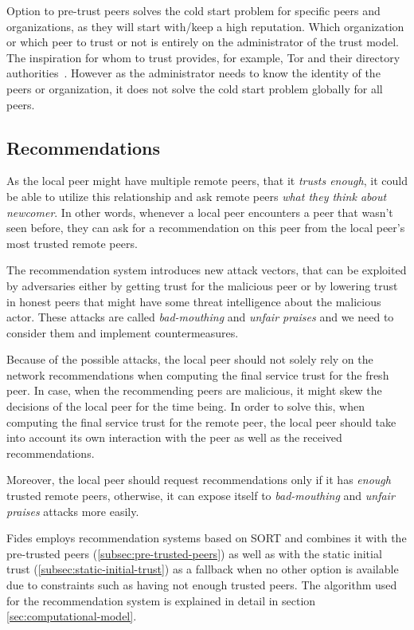 Option to pre-trust peers solves the cold start problem for specific peers and organizations, as they will start with/keep a high reputation.
Which organization or which peer to trust or not is entirely on the administrator of the trust model. The inspiration for whom to trust provides, for example, Tor and their directory authorities~\cite{torauth}.
However as the administrator needs to know the identity of the peers or organization, it does not solve the cold start problem globally for all peers.

\subsection{Recommendations}
\label{subsec:recommendations}
As the local peer might have multiple remote peers, that it \textit{trusts enough}, it could be able to utilize this relationship and ask remote peers \textit{what they think about newcomer}. 
In other words, whenever a local peer encounters a peer that wasn't seen before, they can ask for a recommendation on this peer from the local peer's most trusted remote peers.

The recommendation system introduces new attack vectors, that can be exploited by adversaries either by getting trust for the malicious peer or by lowering trust in honest peers that might have some threat intelligence about the malicious actor. 
These attacks are called \textit{bad-mouthing} and \textit{unfair praises} and we need to consider them and implement countermeasures.

Because of the possible attacks, the local peer should not solely rely on the network recommendations when computing the final service trust for the fresh peer. In case, when the recommending peers are malicious, it might skew the decisions of the local peer for the time being.
In order to solve this, when computing the final service trust for the remote peer, the local peer should take into account its own interaction with the peer as well as the received recommendations.

Moreover, the local peer should request recommendations only if it has \textit{enough} trusted remote peers, otherwise, it can expose itself to \textit{bad-mouthing} and \textit{unfair praises} attacks more easily.

\vspace{7mm}

Fides employs recommendation systems based on SORT \cite{sort} and combines it with the pre-trusted peers (\ref{subsec:pre-trusted-peers}) as well as with the static initial trust (\ref{subsec:static-initial-trust}) as a fallback when no other option is available due to constraints such as having not enough trusted peers.
The algorithm used for the recommendation system is explained in detail in section \ref{sec:computational-model}.